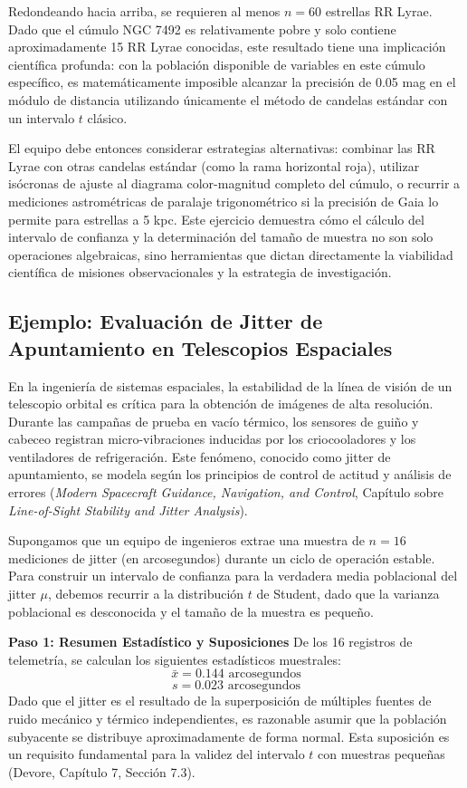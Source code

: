 Redondeando hacia arriba, se requieren al menos $n = 60$ estrellas RR Lyrae. Dado que el cúmulo NGC 7492 es relativamente pobre y solo contiene aproximadamente 15 RR Lyrae conocidas, este resultado tiene una implicación científica profunda: con la población disponible de variables en este cúmulo específico, es matemáticamente imposible alcanzar la precisión de 0.05 mag en el módulo de distancia utilizando únicamente el método de candelas estándar con un intervalo $t$ clásico. 

El equipo debe entonces considerar estrategias alternativas: combinar las RR Lyrae con otras candelas estándar (como la rama horizontal roja), utilizar isócronas de ajuste al diagrama color-magnitud completo del cúmulo, o recurrir a mediciones astrométricas de paralaje trigonométrico si la precisión de Gaia lo permite para estrellas a 5 kpc. Este ejercicio demuestra cómo el cálculo del intervalo de confianza y la determinación del tamaño de muestra no son solo operaciones algebraicas, sino herramientas que dictan directamente la viabilidad científica de misiones observacionales y la estrategia de investigación.


\subsection{Ejemplo: Evaluación de Jitter de Apuntamiento en Telescopios Espaciales}

En la ingeniería de sistemas espaciales, la estabilidad de la línea de visión de un telescopio orbital es crítica para la obtención de imágenes de alta resolución. Durante las campañas de prueba en vacío térmico, los sensores de guiño y cabeceo registran micro-vibraciones inducidas por los criocooladores y los ventiladores de refrigeración. Este fenómeno, conocido como jitter de apuntamiento, se modela según los principios de control de actitud y análisis de errores (\textit{Modern Spacecraft Guidance, Navigation, and Control}, Capítulo sobre \textit{Line-of-Sight Stability and Jitter Analysis}).

Supongamos que un equipo de ingenieros extrae una muestra de $n = 16$ mediciones de jitter (en arcosegundos) durante un ciclo de operación estable. Para construir un intervalo de confianza para la verdadera media poblacional del jitter $\mu$, debemos recurrir a la distribución $t$ de Student, dado que la varianza poblacional es desconocida y el tamaño de la muestra es pequeño.

\textbf{Paso 1: Resumen Estadístico y Suposiciones}
De los 16 registros de telemetría, se calculan los siguientes estadísticos muestrales:
$$ \bar{x} = 0.144 \text{ arcosegundos} $$
$$ s = 0.023 \text{ arcosegundos} $$
Dado que el jitter es el resultado de la superposición de múltiples fuentes de ruido mecánico y térmico independientes, es razonable asumir que la población subyacente se distribuye aproximadamente de forma normal. Esta suposición es un requisito fundamental para la validez del intervalo $t$ con muestras pequeñas (Devore, Capítulo 7, Sección 7.3).

